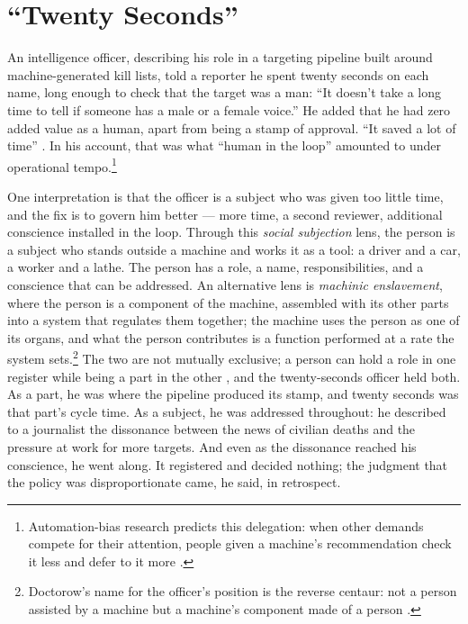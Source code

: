 \chapter{“Twenty Seconds”}
\label{sec:1}
An intelligence officer, describing his role in a targeting pipeline built around machine-generated kill lists, told a reporter he spent twenty seconds on each name, long enough to check that the target was a man: “It doesn't take a long time to tell if someone has a male or a female voice.” He added that he had zero added value as a human, apart from being a stamp of approval. “It saved a lot of time” \autocite{abraham2024lavender}. In his account, that was what “human in the loop” amounted to under operational tempo.\footnote{Automation-bias research predicts this delegation: when other demands compete for their attention, people given a machine's recommendation check it less and defer to it more \autocite{parasuraman2010complacency}.}

One interpretation is that the officer is a subject who was given too little time, and the fix is to govern him better — more time, a second reviewer, additional conscience installed in the loop. Through this \emph{social subjection} lens, the person is a subject who stands outside a machine and works it as a tool: a driver and a car, a worker and a lathe. The person has a role, a name, responsibilities, and a conscience that can be addressed. An alternative lens is \emph{machinic enslavement}, where the person is a component of the machine, assembled with its other parts into a system that regulates them together; the machine uses the person as one of its organs, and what the person contributes is a function performed at a rate the system sets.\footnote{Doctorow's name for the officer's position is the reverse centaur: not a person assisted by a machine but a machine's component made of a person \autocite{doctorow2026reversecentaur}.} The two are not mutually exclusive; a person can hold a role in one register while being a part in the other \autocite{deleuze1987plateaus}, and the twenty-seconds officer held both. As a part, he was where the pipeline produced its stamp, and twenty seconds was that part's cycle time. As a subject, he was addressed throughout: he described to a journalist the dissonance between the news of civilian deaths and the pressure at work for more targets. And even as the dissonance reached his conscience, he went along. It registered and decided nothing; the judgment that the policy was disproportionate came, he said, in retrospect.

